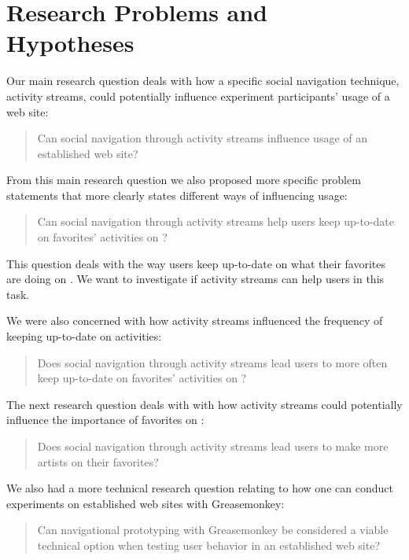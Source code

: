 \section{Research Problems and Hypotheses}

Our main research question deals with how a specific social navigation
technique, activity streams, could potentially influence experiment
participants' usage of a web site:

\begin{quote}
  Can social navigation through activity streams influence
  usage of an established web site?
\end{quote}

From this main research question we also proposed more specific problem
statements that more clearly states different ways of influencing usage:

\begin{quote}
  Can social navigation through activity streams help users keep
  up-to-date on favorites' activities on \urort{}?
\end{quote}

This question deals with the way users keep up-to-date on what their favorites
are doing on \urort{}. We want to investigate if activity streams can help
users in this task.

We were also concerned with how activity streams influenced the
frequency of keeping up-to-date on activities:

\begin{quote}
  Does social navigation through activity streams lead users to more often keep
  up-to-date on favorites' activities on \urort{}?
\end{quote}

The next research question deals with with how activity streams could
potentially influence the importance of favorites on \urort{}:

\begin{quote}
  Does social navigation through activity streams lead users to make
  more artists on \urort{} their favorites?
\end{quote}

We also had a more technical research question relating to how one can
conduct experiments on established web sites with Greasemonkey:

\begin{quote}
  Can navigational prototyping with Greasemonkey be considered a
  viable technical option when testing user behavior in an
  established web site?
\end{quote}

